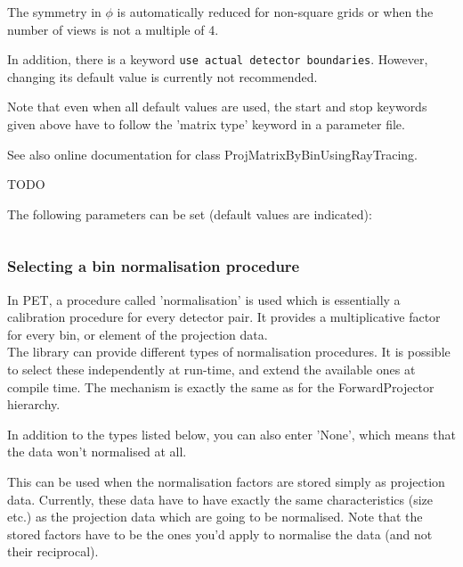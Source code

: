 \documentclass{article}
\begin{document}
The symmetry in $\phi$ is automatically reduced for non-square grids 
or when the number of views is not a multiple of 4.



In addition, there is a keyword \texttt{use actual detector boundaries}. 
However, changing its default value is currently not recommended. 




Note that even when all default values are used, the start and 
stop keywords given above have to follow the 'matrix type' keyword 
in a parameter file.


See also online documentation for class ProjMatrixByBinUsingRayTracing. 

{ 
}
TODO
\label{sec:projmatrixfromfile}

{ 
}

The following parameters can be set (default values are indicated):

\begin{verbatim}

\end{verbatim}


\subsubsection{
Selecting a bin normalisation procedure}
\label{sec:binnormalisation}
In PET, a procedure called 'normalisation' is used which is essentially 
a calibration procedure for every detector pair. It provides 
a multiplicative factor for every bin, or element of the projection 
data.\\
The library can provide different types of normalisation procedures. 
It is possible to select these independently at run-time, and 
extend the available ones at compile time. The mechanism is exactly 
the same as for the ForwardProjector hierarchy.


In addition to the types listed below, you can also enter 'None', 
which means that the data won't normalised at all.

{ 
}

This can be used when the normalisation factors are stored simply 
as projection data. Currently, these data have to have exactly 
the same characteristics (size etc.) as the projection data which 
are going to be normalised. Note that the stored factors have 
to be the ones you'd apply to normalise the data (and not their 
reciprocal).
\end{document}
